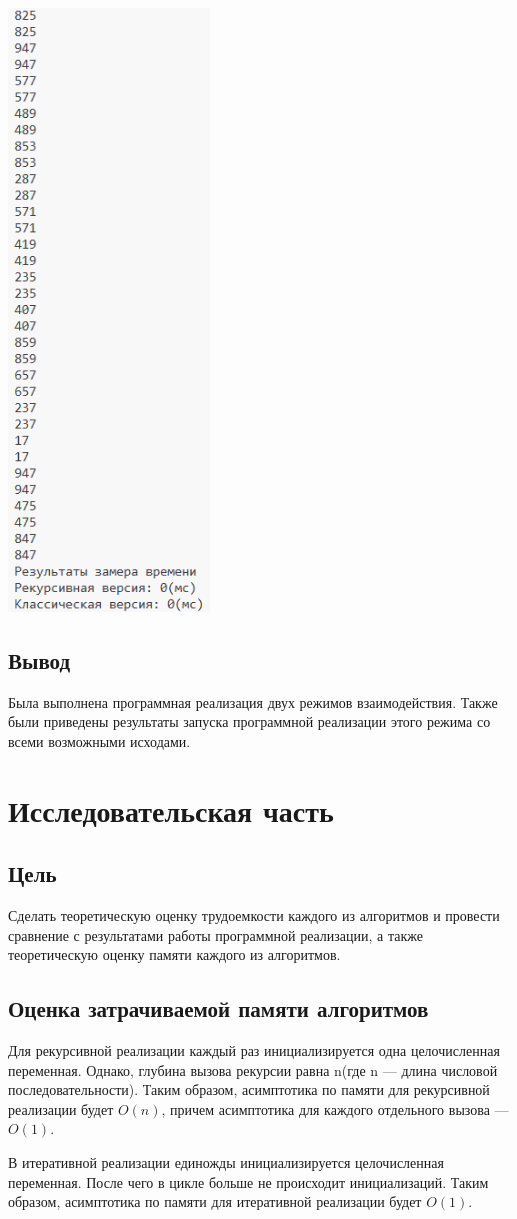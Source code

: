 \documentclass[14pt]{article}
\begin{document}
		\begin{center}
		\includegraphics[width = 0.4\textwidth]{example_5.png}
		\label{fig:5}
	\end{center}
	\subsection{Вывод} 
	Была выполнена программная реализация двух режимов взаимодействия. Также были приведены результаты запуска программной реализации этого режима со всеми возможными исходами.
		\newpage
	\section{Исследовательская часть}
	\subsection{Цель}
	Сделать теоретическую оценку трудоемкости каждого из алгоритмов и провести сравнение с результатами работы программной реализации, а также теоретическую оценку памяти каждого из алгоритмов.
	\subsection{Оценка затрачиваемой памяти алгоритмов}
	Для рекурсивной реализации каждый раз инициализируется одна целочисленная переменная. Однако, глубина вызова рекурсии равна n(где n --- длина числовой последовательности). Таким образом, асимптотика по памяти для рекурсивной реализации будет $O(n)$, причем асимптотика для каждого отдельного вызова --- $O(1)$.\par
	В итеративной реализации единожды инициализируется целочисленная переменная. После чего в цикле больше не происходит инициализаций. Таким образом, асимптотика по памяти для итеративной реализации будет $O(1)$.
\end{document}
